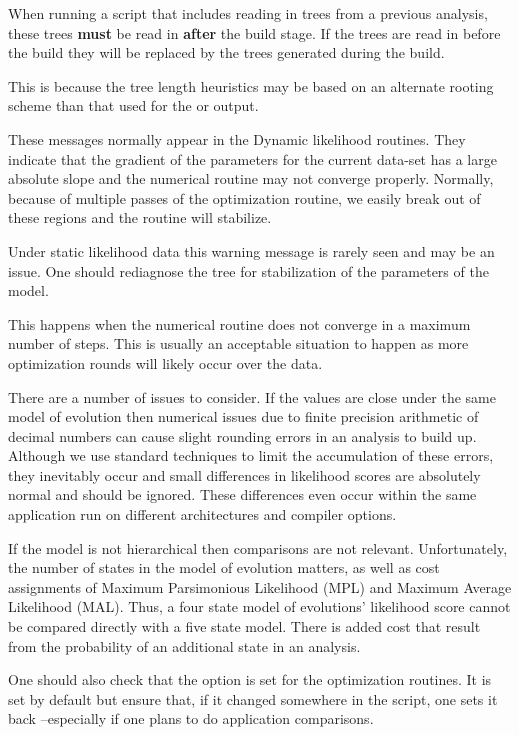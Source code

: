 {When running a script that includes reading in trees from a previous analysis, these trees {\bf must} be read 
in {\bf after} the build stage.  If the trees are read in before the build they will be replaced by the trees 
generated during the build.}

{This is because the tree length heuristics may be based on an alternate rooting scheme than that 
used for the  or  output.}

{These messages normally appear in the Dynamic likelihood routines. They indicate that the gradient
of the parameters for the current data-set has a large absolute slope and the numerical routine may
not converge properly. Normally, because of multiple passes of the optimization routine, we easily
break out of these regions and the routine will stabilize.

Under static likelihood data this warning message is rarely seen and may be an issue. One should
rediagnose the tree for stabilization of the parameters of the model.}

{This happens when the numerical routine does not converge in a maximum number of steps. This is
usually an acceptable situation to happen as more optimization rounds will likely occur over the
data.}

{There are a number of issues to consider. If the values are close under the same model of
evolution then numerical issues due to finite precision arithmetic of decimal numbers can cause
slight rounding errors in an analysis to build up. Although we use standard techniques to limit the
accumulation of these errors, they inevitably occur and small differences in likelihood scores are
absolutely normal and should be ignored. These differences even occur within the same application
run on different architectures and compiler options.

If the model is not hierarchical then comparisons are not relevant. Unfortunately, the number of
states in the model of evolution matters, as well as cost assignments of Maximum Parsimonious
Likelihood (MPL) and Maximum Average Likelihood (MAL). Thus, a four state model of evolutions'
likelihood score cannot be compared directly with a five state model. There is added cost that
result from the probability of an additional state in an analysis. 

One should also check that the  option is set for the optimization routines.
It is set by default but ensure that, if it changed somewhere in the script, one sets it back
--especially if one plans to do application comparisons.}
